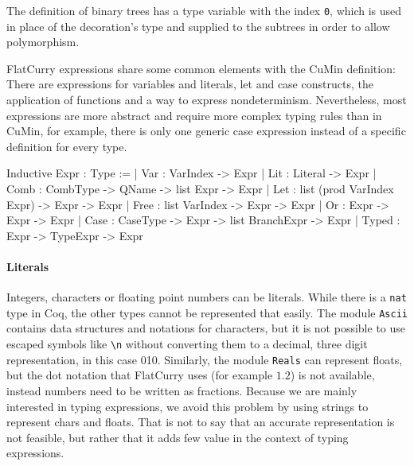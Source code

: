 \documentclass[paper = a4, fleqn, abstract=on, twoside]{scrreprt}
\begin{document}
The definition of binary trees has a type variable with the index \texttt{0}, which is used in place of the decoration's type and supplied to the subtrees in order to allow polymorphism.\\
\par \noindent
FlatCurry expressions share some common elements with the CuMin definition: There are expressions for variables and literals, let and case constructs, the application of functions and a way to express nondeterminism. Nevertheless, most expressions are more abstract and require more complex typing rules than in CuMin, for example, there is only one generic case expression instead of a specific definition for every type.
\begin{coqcode}
Inductive Expr : Type := 
  | Var   : VarIndex -> Expr
  | Lit   : Literal -> Expr
  | Comb  : CombType -> QName -> list Expr -> Expr
  | Let   : list (prod VarIndex Expr) -> Expr -> Expr
  | Free  : list VarIndex -> Expr -> Expr
  | Or    : Expr -> Expr -> Expr
  | Case  : CaseType -> Expr -> list BranchExpr -> Expr
  | Typed : Expr -> TypeExpr -> Expr
\end{coqcode}
\paragraph{Literals}
Integers, characters or floating point numbers can be literals. While there is a \texttt{nat} type in Coq, the other types cannot be represented that easily. The module \texttt{Ascii} contains data structures and notations for characters, but it is not possible to use escaped symbols like \texttt{\textbackslash n} without converting them to a decimal, three digit representation, in this case 010. Similarly, the module \texttt{Reals} can represent floats, but the dot notation that FlatCurry uses (for example $1.2$) is not available, instead numbers need to be written as fractions. Because we are mainly interested in typing expressions, we avoid this problem by using strings to represent chars and floats. That is not to say that an accurate representation is not feasible, but rather that it adds few value in the context of typing expressions. 
\end{document}
